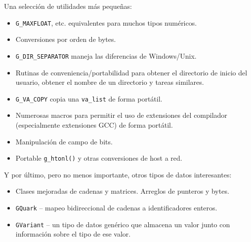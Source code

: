 Una selección de utilidades más pequeñas:
\begin{itemize}
    \item \lstinline{G_MAXFLOAT}, etc. equivalentes para muchos tipos numéricos.
    \item Conversiones por orden de bytes.
    \item \lstinline{G_DIR_SEPARATOR} maneja las diferencias de Windows/Unix.
    \item Rutinas de conveniencia/portabilidad para obtener el directorio de inicio del usuario, obtener el nombre de un directorio  y tareas similares.
    \item \lstinline{G_VA_COPY} copia una \lstinline{va_list} de forma portátil.
    \item Numerosas macros para permitir el uso de extensiones del compilador (especialmente extensiones GCC) de forma portátil.
    \item Manipulación de campo de bits.
    \item Portable \lstinline {g_htonl()} y otras conversiones de host a red.
\end{itemize}

Y por último, pero no menos importante, otros tipos de datos interesantes:
\begin{itemize}
    \item Clases mejoradas de cadenas y matrices. Arreglos de punteros y bytes.
    \item \lstinline{GQuark} -- mapeo bidireccional de cadenas a identificadores enteros.
    \item \lstinline{GVariant} -- un tipo de datos genérico que almacena un valor junto con información sobre el tipo de ese valor.
\end{itemize}